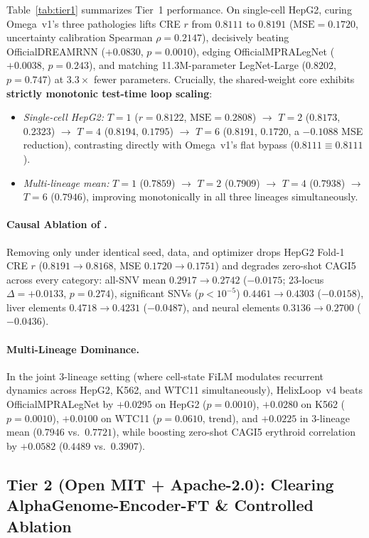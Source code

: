\documentclass[10.5pt,a4paper]{article}
\begin{document}
Table~\ref{tab:tier1} summarizes Tier~1 performance. On single-cell HepG2, curing Omega~v1's three pathologies lifts CRE $r$ from $0.8111$ to $0.8191$ ($\text{MSE}=0.1720$, uncertainty calibration Spearman $\rho=0.2147$), decisively beating OfficialDREAMRNN ($+0.0830$, $p=0.0010$), edging OfficialMPRALegNet ($+0.0038$, $p=0.243$), and matching 11.3M-parameter LegNet-Large ($0.8202$, $p=0.747$) at $3.3\times$ fewer parameters. Crucially, the shared-weight core exhibits \textbf{strictly monotonic test-time loop scaling}:
\begin{itemize}
\item \emph{Single-cell HepG2:} $T=1$ ($r=0.8122$, $\text{MSE}=0.2808$) $\to$ $T=2$ ($0.8173$, $0.2323$) $\to$ $T=4$ ($0.8194$, $0.1795$) $\to$ $T=6$ ($0.8191$, $0.1720$, a $-0.1088$ MSE reduction), contrasting directly with Omega~v1's flat bypass ($0.8111\equiv 0.8111$).
\item \emph{Multi-lineage mean:} $T=1$ ($0.7859$) $\to$ $T=2$ ($0.7909$) $\to$ $T=4$ ($0.7938$) $\to$ $T=6$ ($0.7946$), improving monotonically in all three lineages simultaneously.
\end{itemize}

\paragraph{Causal Ablation of .}
Removing only  under identical seed, data, and optimizer drops HepG2 Fold-1 CRE $r$ ($0.8191\to 0.8168$, MSE $0.1720\to 0.1751$) and degrades zero-shot CAGI5 across every category: all-SNV mean $0.2917\to 0.2742$ ($-0.0175$; 23-locus $\Delta=+0.0133$, $p=0.274$), significant SNVs ($p<10^{-5}$) $0.4461\to 0.4303$ ($-0.0158$), liver elements $0.4718\to 0.4231$ ($-0.0487$), and neural elements $0.3136\to 0.2700$ ($-0.0436$).

\paragraph{Multi-Lineage Dominance.}
In the joint 3-lineage setting (where cell-state FiLM modulates recurrent dynamics across HepG2, K562, and WTC11 simultaneously), HelixLoop~v4 beats OfficialMPRALegNet by $+0.0295$ on HepG2 ($p=0.0010$), $+0.0280$ on K562 ($p=0.0010$), $+0.0100$ on WTC11 ($p=0.0610$, trend), and $+0.0225$ in 3-lineage mean ($0.7946$ vs.\ $0.7721$), while boosting zero-shot CAGI5 erythroid correlation by $+0.0582$ ($0.4489$ vs.\ $0.3907$).

\subsection{Tier 2 (Open MIT + Apache-2.0): Clearing AlphaGenome-Encoder-FT \& Controlled Ablation}
\end{document}
